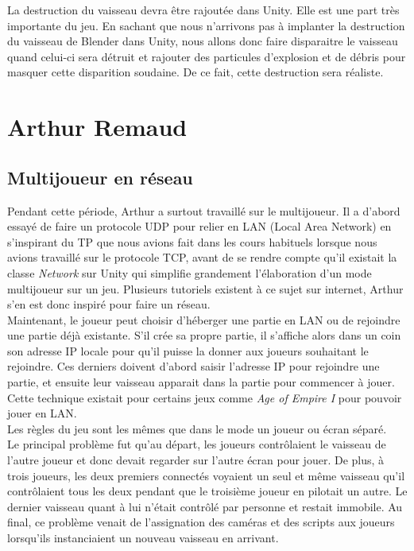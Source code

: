 \documentclass[10pt, titlepage]{report}
\begin{document}
La destruction du vaisseau devra être rajoutée dans Unity. Elle est une part très importante du jeu. En sachant que nous n'arrivons pas à implanter la destruction du vaisseau de Blender dans Unity, nous allons donc faire disparaitre le vaisseau quand celui-ci sera détruit et rajouter des particules d'explosion et de débris pour masquer cette disparition soudaine. De ce fait, cette destruction sera réaliste.\\


\section{Arthur Remaud}

\subsection{Multijoueur en réseau}
Pendant cette période, Arthur a surtout travaillé sur le multijoueur. Il a d'abord essayé de faire un protocole UDP pour relier en LAN (Local Area Network) en s'inspirant du TP que nous avions fait dans les cours habituels lorsque nous avions travaillé sur le protocole TCP, avant de se rendre compte qu'il existait la classe \textit{Network} sur Unity qui simplifie grandement l'élaboration d'un mode multijoueur sur un jeu. Plusieurs tutoriels existent à ce sujet sur internet, Arthur s'en est donc inspiré pour faire un réseau.\\

Maintenant, le joueur peut choisir d'héberger une partie en LAN ou de rejoindre une partie déjà existante. S'il crée sa propre partie, il s'affiche alors dans un coin son adresse IP locale pour qu'il puisse la donner aux joueurs souhaitant le rejoindre. Ces derniers doivent d'abord saisir l'adresse IP pour rejoindre une partie, et ensuite leur vaisseau apparait dans la partie pour commencer à jouer. Cette technique existait pour certains jeux comme \textit{Age of Empire I} pour pouvoir jouer en LAN.\\

Les règles du jeu sont les mêmes que dans le mode un joueur ou écran séparé.\\

Le principal problème fut qu'au départ, les joueurs contrôlaient le vaisseau de l'autre joueur et donc devait regarder sur l'autre écran pour jouer. De plus, à trois joueurs, les deux premiers connectés voyaient un seul et même vaisseau qu'il contrôlaient tous les deux pendant que le troisième joueur en pilotait un autre. Le dernier vaisseau quant à lui n'était contrôlé par personne et restait immobile. Au final, ce problème venait de l'assignation des caméras et des scripts aux joueurs lorsqu'ils instanciaient un nouveau vaisseau en arrivant.\\
\end{document}
